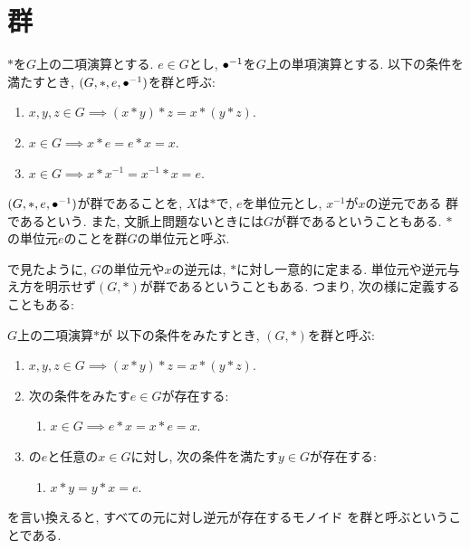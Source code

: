 \section{群}
\begin{definition}
  $\ast$を$G$上の二項演算とする.
  $e\in G$とし,
  ${\bullet}^{-1}$を$G$上の単項演算とする.
  以下の条件を満たすとき,
  $(G,\ast,e,{\bullet}^{-1})$を群と呼ぶ:
  \begin{enumerate}
  \item $x,y,z\in G\implies (x\ast y) \ast z = x\ast (y\ast z)$.
  \item $x\in G\implies x\ast e=e\ast x =x$.
  \item $x\in G \implies x\ast x^{-1}=x^{-1}\ast x =e$.
  \end{enumerate}
\end{definition}
\begin{remark}
  $(G,\ast,e, {\bullet}^{-1})$が群であることを,
  $X$は$\ast$で,
  $e$を単位元とし, $x^{-1}$が$x$の逆元である
  群であるという.
  また, 文脈上問題ないときには$G$が群であるということもある.
  $\ast$の単位元$e$のことを群$G$の単位元と呼ぶ.
\end{remark}
で見たように,
$G$の単位元や$x$の逆元は,
$\ast$に対し一意的に定まる.
単位元や逆元与え方を明示せず$(G,\ast)$が群であるということもある.
つまり, 次の様に定義することもある:
\begin{definition}
  \label{def:grp:alt}
 $G$上の二項演算$\ast$が
  以下の条件をみたすとき,
  $(G,\ast)$を群と呼ぶ:
  \begin{enumerate}
    \item $x,y,z\in G \implies (x\ast y)\ast z=x\ast(y\ast z)$.
    \item
      \label{def:grp:alt:item:e}
      次の条件をみたす$e\in G$が存在する:
      \begin{enumerate}
        \item
        $x\in G \implies e\ast x = x\ast e= x$.
      \end{enumerate}
    \item
      の$e$と任意の$x\in G$に対し,
      次の条件を満たす$y\in G$が存在する:
      \begin{enumerate}
      \item $x\ast y=y\ast x=e$.
      \end{enumerate}
  \end{enumerate}
\end{definition}
\begin{remark}
  を言い換えると,
  すべての元に対し逆元が存在するモノイド
  を群と呼ぶということである.
\end{remark}

